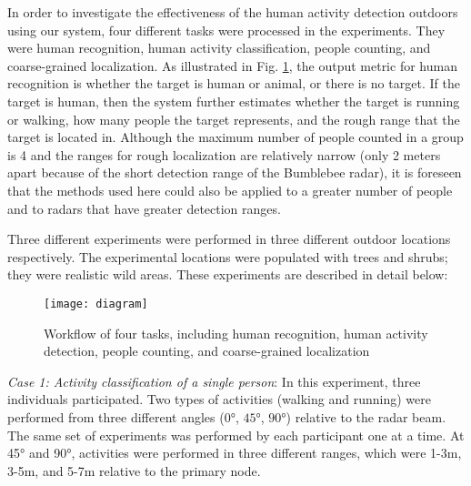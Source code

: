 In order to investigate the effectiveness of the human activity detection outdoors using our system, four different tasks were processed in the experiments. They were human recognition, human activity classification, people counting, and coarse-grained localization. As illustrated in Fig. \ref{fig_dia}, the output metric for human recognition is whether the target is human or animal, or there is no target. If the target is human, then the system further estimates whether the target is running or walking, how many people the target represents, and the rough range that the target is located in. Although the maximum number of people counted in a group is 4 and the ranges for rough localization are relatively narrow (only 2 meters apart because of the short detection range of the Bumblebee radar), it is foreseen that the methods used here could also be applied to a greater number of people and to radars that have greater detection ranges.

Three different experiments were performed in three different outdoor locations respectively. The experimental locations were populated with trees and shrubs; they were realistic wild areas. These experiments are described in detail below:  
\begin{figure}[!t]
\centering
\texttt{[image: diagram]}
\caption{Workflow of four tasks, including human recognition, human activity \qquad detection, people counting, and coarse-grained localization}
\label{fig_dia}
\end{figure}

\textit{Case 1: Activity classification of a single person}: In this experiment, three individuals participated. Two types of activities (walking and running) were performed from three different angles ($\ang{0}$, $\ang{45}$, $\ang{90}$) relative to the radar beam. The same set of experiments was performed by each participant one at a time. At \ang{45} and \ang{90}, activities were performed in three different ranges, which were 1-3m, 3-5m, and 5-7m relative to the primary node. 

